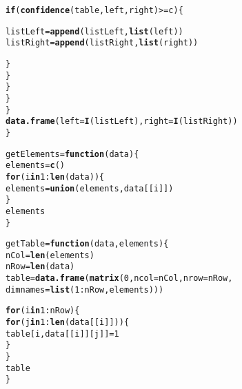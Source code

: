 \documentclass[12pt]{report}\usepackage[]{graphicx}\usepackage[dvipsnames]{xcolor}
\makeatletter
\newcommand{\hlnum}[1]{\textcolor[rgb]{0.686,0.059,0.569}{#1}}%
\newcommand{\hlopt}[1]{\textcolor[rgb]{0,0,0}{#1}}%
\newcommand{\hlstd}[1]{\textcolor[rgb]{0.345,0.345,0.345}{#1}}%
\newcommand{\hlkwa}[1]{\textcolor[rgb]{0.161,0.373,0.58}{\textbf{#1}}}%
\newcommand{\hlkwb}[1]{\textcolor[rgb]{0.69,0.353,0.396}{#1}}%
\newcommand{\hlkwc}[1]{\textcolor[rgb]{0.333,0.667,0.333}{#1}}%
\newcommand{\hlkwd}[1]{\textcolor[rgb]{0.737,0.353,0.396}{\textbf{#1}}}%
\newenvironment{kframe}{%
 \def\at@end@of@kframe{}%
 \ifinner\ifhmode%
  \def\at@end@of@kframe{\end{minipage}}%
  \begin{minipage}{\columnwidth}%
 \fi\fi%
 \def\FrameCommand##1{\hskip\@totalleftmargin \hskip-\fboxsep
 \colorbox{shadecolor}{##1}\hskip-\fboxsep
     \hskip-\linewidth \hskip-\@totalleftmargin \hskip\columnwidth}%
 \MakeFramed {\advance\hsize-\width
   \@totalleftmargin\z@ \linewidth\hsize
   \@setminipage}}%
 {\par\unskip\endMakeFramed%
 \at@end@of@kframe}
\newenvironment{knitrout}{}{} %
\makeatother
\begin{document}
\begin{knitrout}
\begin{kframe}
\begin{alltt}
                                        \hlkwa{if} \hlstd{(}\hlkwd{confidence}\hlstd{(table, left, right)} \hlopt{>=} \hlstd{c) \{}

                                                \hlstd{listLeft} \hlkwb{=} \hlkwd{append}\hlstd{(listLeft ,} \hlkwd{list}\hlstd{(left))}
                                                \hlstd{listRight} \hlkwb{=} \hlkwd{append}\hlstd{(listRight ,} \hlkwd{list}\hlstd{(right))}

                                        \hlstd{\}}
                                \hlstd{\}}
                        \hlstd{\}}
                \hlstd{\}}
        \hlstd{\}}
        \hlkwd{data.frame}\hlstd{(}\hlkwc{left} \hlstd{=} \hlkwd{I}\hlstd{(listLeft),} \hlkwc{right} \hlstd{=} \hlkwd{I}\hlstd{(listRight))}
\hlstd{\}}
\end{alltt}
\end{kframe}
\end{knitrout}
			
			
			
\begin{knitrout}
\color{fgcolor}\begin{kframe}
\begin{alltt}
\hlstd{getElements} \hlkwb{=} \hlkwa{function}\hlstd{(}\hlkwc{data}\hlstd{) \{}
        \hlstd{elements} \hlkwb{=} \hlkwd{c}\hlstd{()}
        \hlkwa{for} \hlstd{(i} \hlkwa{in} \hlnum{1}\hlopt{:}\hlkwd{len}\hlstd{(data)) \{}
                \hlstd{elements} \hlkwb{=} \hlkwd{union}\hlstd{(elements, data[[i]])}
        \hlstd{\}}
        \hlstd{elements}
\hlstd{\}}

\hlstd{getTable} \hlkwb{=} \hlkwa{function}\hlstd{(}\hlkwc{data}\hlstd{,} \hlkwc{elements}\hlstd{) \{}
        \hlstd{nCol} \hlkwb{=} \hlkwd{len}\hlstd{(elements)}
        \hlstd{nRow} \hlkwb{=} \hlkwd{len}\hlstd{(data)}
        \hlstd{table} \hlkwb{=} \hlkwd{data.frame}\hlstd{(}\hlkwd{matrix}\hlstd{(}\hlnum{0}\hlstd{,} \hlkwc{ncol} \hlstd{= nCol,} \hlkwc{nrow} \hlstd{= nRow,}
        \hlkwc{dimnames} \hlstd{=} \hlkwd{list}\hlstd{(}\hlnum{1}\hlopt{:}\hlstd{nRow, elements)))}

        \hlkwa{for} \hlstd{(i} \hlkwa{in} \hlnum{1}\hlopt{:}\hlstd{nRow) \{}
                \hlkwa{for} \hlstd{(j} \hlkwa{in} \hlnum{1}\hlopt{:}\hlkwd{len}\hlstd{(data[[i]])) \{}
                        \hlstd{table[i, data[[i]][j]]} \hlkwb{=} \hlnum{1}
                \hlstd{\}}
        \hlstd{\}}
        \hlstd{table}
\hlstd{\}}
\end{alltt}
\end{kframe}
\end{knitrout}
			
\end{document}
